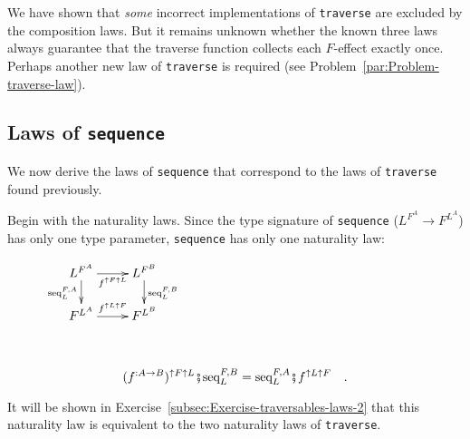 We have shown that \emph{some} incorrect implementations of \lstinline!traverse!
are excluded by the composition laws. But it remains unknown whether
the known three laws always guarantee that the traverse function collects
each $F$-effect exactly once. Perhaps another new law of \lstinline!traverse!
is required (see Problem~\ref{par:Problem-traverse-law}).

\subsection{Laws of \texttt{sequence}}

We now derive the laws of \lstinline!sequence! that correspond to
the laws of \lstinline!traverse! found previously. 

Begin with the naturality laws. Since the type signature of \lstinline!sequence!
($L^{F^{A}}\rightarrow F^{L^{A}}$) has only one type parameter, \lstinline!sequence!
has only one naturality law:%
\begin{comment}
precarious formatting
\end{comment}

\begin{wrapfigure}{i}{0.22\columnwidth}%
\vspace{-1.3\baselineskip}
$\xymatrix{\xyScaleY{1.5pc}\xyScaleX{2.0pc}L^{F^{A}}\ar[d]\sb(0.45){\text{seq}_{L}^{F,A}}\ar[r]\sb(0.5){f^{\uparrow F\uparrow L}} & L^{F^{B}}\ar[d]\sp(0.45){\text{seq}_{L}^{F,B}}\\
F^{L^{A}}\ar[r]\sp(0.5){f^{\uparrow L\uparrow F}} & F^{L^{B}}
}
$\vspace{1.5\baselineskip}
\end{wrapfigure}%

~\vspace{-1.4\baselineskip}

\begin{equation}
(f^{:A\rightarrow B})^{\uparrow F\uparrow L}\bef\text{seq}_{L}^{F,B}=\text{seq}_{L}^{F,A}\bef f^{\uparrow L\uparrow F}\quad.\label{eq:sequence-naturality-law}
\end{equation}

\noindent It will be shown in Exercise~\ref{subsec:Exercise-traversables-laws-2}
that this naturality law is equivalent to the two naturality laws
of \lstinline!traverse!.

